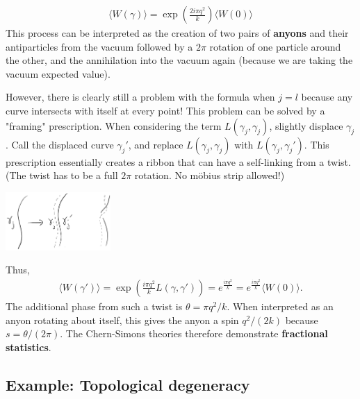 \documentclass[aps,nofootinbib]{revtex4}
\begin{document}
\begin{align}\label{anyon phase}
\langle W(\gamma) \rangle = \exp \left(\frac{2 i\pi q^2}{k} \right) \langle W(0) \rangle
\end{align}
This process can be interpreted as the creation of two pairs of {\bf anyons} and their antiparticles from the vacuum  followed by a $2\pi$ rotation of one particle around the other, and the annihilation into the vacuum again (because we are taking the vacuum expected value). 

However, there is clearly still a problem with the formula when $j=l$ because any curve intersects with itself at every point! This problem can be solved by a "framing" prescription. When considering the term $L(\gamma_j,\gamma_j)$, slightly displace $\gamma_j$. Call the displaced curve $\gamma_j'$, and replace $L(\gamma_j,\gamma_j)$ with $L(\gamma_j,\gamma_j')$. This prescription essentially creates a ribbon that can have a self-linking from a twist. (The twist has to be a full $2\pi$ rotation. No m{\"o}bius strip allowed!)
\begin{center}
\includegraphics[width=0.3\textwidth]{ribbon.png}
\end{center}
Thus,
\begin{align}
\langle W(\gamma') \rangle = \exp \left( \frac{i\pi q^2}{k} L(\gamma,\gamma') \right) = e^{\frac{i\pi q^2}{k}} = e^{\frac{i\pi q^2}{k}} \langle W(0) \rangle. 
\end{align}
The additional phase from such a twist is $\theta = \pi q^2/k$. When interpreted as an anyon rotating about itself, this gives the anyon a spin $q^2/(2k)$ because $s = \theta/(2\pi)$. The Chern-Simons theories therefore demonstrate {\bf fractional statistics}.

\subsection{Example: Topological degeneracy}\label{degeneracy}
\end{document}
